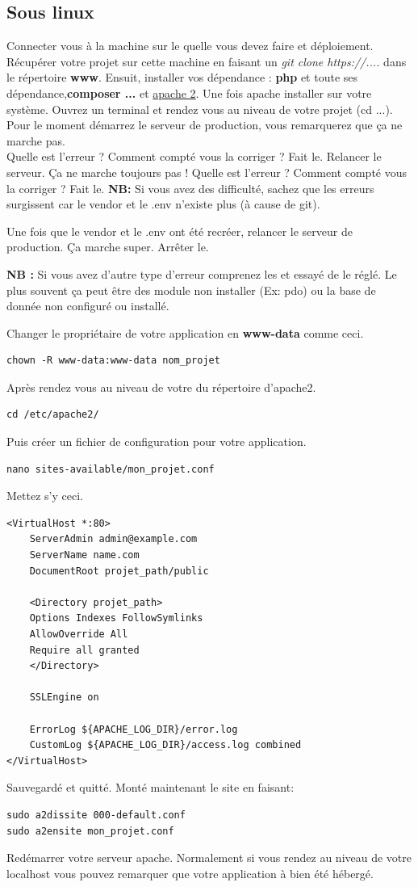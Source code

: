 \documentclass[12pt,a4paper]{article}
\begin{document}
\subsection{Sous linux}
Connecter vous à la machine sur le quelle vous devez faire et déploiement. Récupérer votre projet sur cette machine en faisant un \textit{git clone https://....} dans le répertoire 
\textbf{www}. Ensuit, 
installer vos dépendance : \textbf{php} et toute ses dépendance,\textbf{composer ...} et
\href{https://doc.ubuntu-fr.org/apache2}{apache 2}. Une fois apache installer sur votre 
système. Ouvrez un terminal et rendez vous au niveau de votre projet (cd ...). Pour le moment
démarrez le serveur de production, vous remarquerez que ça ne marche pas. \\
Quelle est l'erreur ? Comment compté vous la corriger ? Fait le.
Relancer le serveur. Ça ne marche toujours pas ! Quelle est l'erreur ? Comment compté vous la
corriger ? Fait le.
\textbf{NB:} Si vous avez des difficulté, sachez que les erreurs surgissent car le 
vendor et le .env n'existe plus (à cause de git).

Une fois que le vendor et le .env ont été recréer, relancer le serveur de production. Ça marche super. Arrêter le.

\textbf{NB :} Si vous avez d'autre type d'erreur comprenez les et essayé de le 
réglé. Le plus souvent ça peut être des module non installer (Ex: pdo) ou la base de 
donnée non configuré ou installé.

Changer le propriétaire de votre application en \textbf{www-data} comme ceci.
\begin{verbatim}
chown -R www-data:www-data nom_projet
\end{verbatim} 
Après rendez vous au niveau de votre du répertoire d'apache2.
\begin{verbatim}
cd /etc/apache2/
\end{verbatim} 
Puis créer un fichier de configuration pour votre application.
\begin{verbatim}
nano sites-available/mon_projet.conf
\end{verbatim}
Mettez s'y ceci.
\begin{verbatim}
<VirtualHost *:80>
    ServerAdmin admin@example.com
    ServerName name.com
    DocumentRoot projet_path/public

    <Directory projet_path>
    Options Indexes FollowSymlinks
    AllowOverride All
    Require all granted
    </Directory>

    SSLEngine on
    
    ErrorLog ${APACHE_LOG_DIR}/error.log
    CustomLog ${APACHE_LOG_DIR}/access.log combined
</VirtualHost>
\end{verbatim}
Sauvegardé et quitté. Monté maintenant le site  en faisant:
\begin{verbatim}
sudo a2dissite 000-default.conf 
sudo a2ensite mon_projet.conf
\end{verbatim}
Redémarrer votre serveur apache. Normalement si vous rendez au niveau de votre 
localhost vous pouvez remarquer que votre application à bien été hébergé.
\end{document}
